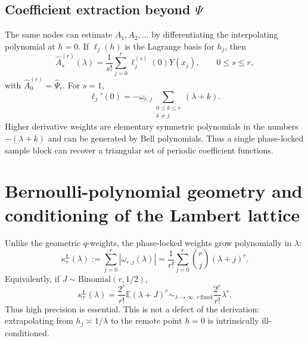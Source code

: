 \documentclass[11pt]{article}
\theoremstyle{definition}
\theoremstyle{remark}
\begin{document}
\subsection{Coefficient extraction beyond \texorpdfstring{$\Psi$}{Psi}}

The same nodes can estimate $A_1,A_2,\ldots$ by differentiating the interpolating polynomial at $h=0$. If $\ell_j(h)$ is the Lagrange basis for $h_j$, then
\begin{equation}
\widehat A_s^{(r)}(\lambda)
=\frac1{s!}\sum_{j=0}^{r}\ell_j^{(s)}(0)Y(x_j),
\qquad 0\le s\le r,
\label{eq:As-extractor}
\end{equation}
with $\widehat A_0^{(r)}=\widehat\Psi_r$. For $s=1$,
\begin{equation}
\ell_j'(0)
=-\omega_{r,j}\sum_{\substack{0\le k\le r\\k\ne j}}(\lambda+k).
\label{eq:first-derivative-weight}
\end{equation}
Higher derivative weights are elementary symmetric polynomials in the numbers $-(\lambda+k)$ and can be generated by Bell polynomials. Thus a single phase-locked sample block can recover a triangular set of periodic coefficient functions.

\section{Bernoulli-polynomial geometry and conditioning of the Lambert lattice}
\label{sec:lambert-conditioning}

Unlike the geometric $q$-weights, the phase-locked weights grow polynomially in $\lambda$:
\begin{equation}
\kappa_r^{\mathrm L}(\lambda)
:=\sum_{j=0}^{r}|\omega_{r,j}(\lambda)|
=\frac1{r!}\sum_{j=0}^{r}\binom{r}{j}(\lambda+j)^r.
\label{eq:lambert-condition}
\end{equation}
Equivalently, if $J\sim\mathrm{Binomial}(r,1/2)$,
\begin{equation}
\kappa_r^{\mathrm L}(\lambda)
=\frac{2^r}{r!}\mathbb E(\lambda+J)^r
\sim_{\lambda\to\infty,\,r\,\mathrm{fixed}}\frac{2^r}{r!}\lambda^r.
\label{eq:lambert-condition-asymp}
\end{equation}
Thus high precision is essential. This is not a defect of the derivation: extrapolating from $h_j\asymp1/\lambda$ to the remote point $h=0$ is intrinsically ill-conditioned.
\end{document}
